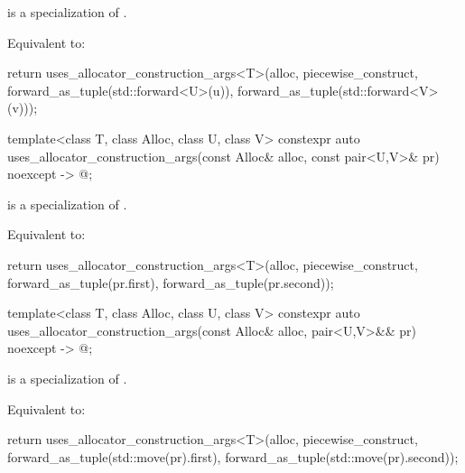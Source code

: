 \begin{itemdescr}
\pnum
\constraints
{} is a specialization of .

\pnum
\effects
Equivalent to:
\begin{codeblock}
return uses_allocator_construction_args<T>(alloc, piecewise_construct,
                                           forward_as_tuple(std::forward<U>(u)),
                                           forward_as_tuple(std::forward<V>(v)));
\end{codeblock}
\end{itemdescr}

%
\begin{itemdecl}
template<class T, class Alloc, class U, class V>
  constexpr auto uses_allocator_construction_args(const Alloc& alloc,
                                                  const pair<U,V>& pr) noexcept -> @\seebelow@;
\end{itemdecl}

\begin{itemdescr}
\pnum
\constraints
{} is a specialization of .

\pnum
\effects
Equivalent to:
\begin{codeblock}
return uses_allocator_construction_args<T>(alloc, piecewise_construct,
                                           forward_as_tuple(pr.first),
                                           forward_as_tuple(pr.second));
\end{codeblock}
\end{itemdescr}

%
\begin{itemdecl}
template<class T, class Alloc, class U, class V>
  constexpr auto uses_allocator_construction_args(const Alloc& alloc,
                                                  pair<U,V>&& pr) noexcept -> @\seebelow@;
\end{itemdecl}

\begin{itemdescr}
\pnum
\constraints
{} is a specialization of .

\pnum
\effects
Equivalent to:
\begin{codeblock}
return uses_allocator_construction_args<T>(alloc, piecewise_construct,
                                           forward_as_tuple(std::move(pr).first),
                                           forward_as_tuple(std::move(pr).second));
\end{codeblock}
\end{itemdescr}

